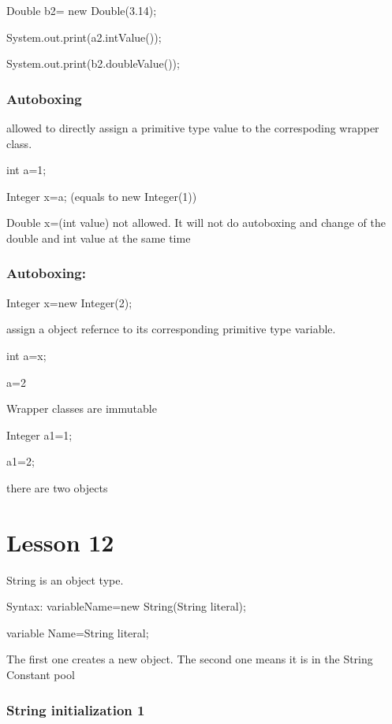 \documentclass[
  paper=a4,
  ,captions=tableheading
]{scrartcl}
\begin{document}
Double b2= new Double(3.14);

System.out.print(a2.intValue());

System.out.print(b2.doubleValue());

\hypertarget{autoboxing}{%
\subsubsection{Autoboxing}\label{autoboxing}}

allowed to directly assign a primitive type value to the correspoding
wrapper class.

int a=1;

Integer x=a; (equals to new Integer(1))

Double x=(int value) not allowed. It will not do autoboxing and change
of the double and int value at the same time

\hypertarget{autoboxing-1}{%
\subsubsection{Autoboxing:}\label{autoboxing-1}}

Integer x=new Integer(2);

assign a object refernce to its corresponding primitive type variable.

int a=x;

a=2

Wrapper classes are immutable

Integer a1=1;

a1=2;

there are two objects

\hypertarget{lesson-12}{%
\section{Lesson 12}\label{lesson-12}}

String is an object type.

Syntax: variableName=new String(String literal);

variable Name=String literal;

The first one creates a new object. The second one means it is in the
String Constant pool

\hypertarget{string-initialization-1}{%
\subsubsection{String initialization 1}\label{string-initialization-1}}
\end{document}
